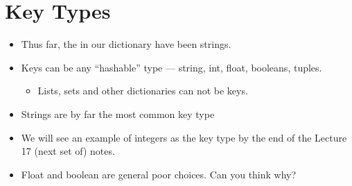 \documentclass[letterpaper,10pt,english]{sphinxmanual}
\begin{document}
\section{Key Types}
\label{\detokenize{lecture_notes/lec16_dictionaries1:key-types}}\begin{itemize}
\item {} 
Thus far, the  in our dictionary have been strings.

\item {} 
Keys can be any “hashable” type — string, int, float, booleans, tuples.
\begin{itemize}
\item {} 
Lists, sets and other dictionaries can not be keys.

\end{itemize}

\item {} 
Strings are by far the most common key type

\item {} 
We will see an example of integers as the key type by the end of
the Lecture 17 (next set of) notes.

\item {} 
Float and boolean are general poor choices. Can you think why?

\end{itemize}
\end{document}
